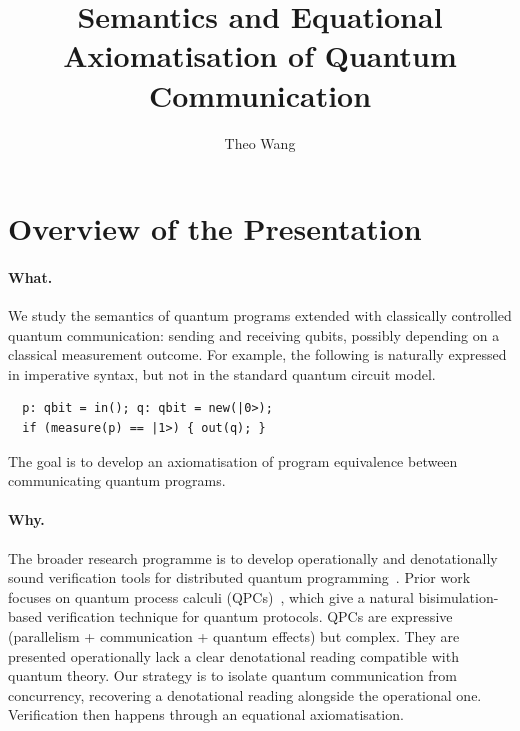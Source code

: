 \documentclass[sigplan, nonacm]{acmart}
\begin{document}
\title{Semantics and Equational Axiomatisation of Quantum Communication}

\author{Theo Wang}

\maketitle

\section{Overview of the Presentation}

\paragraph{What.} We study the semantics of quantum programs extended with classically controlled quantum communication: sending and receiving qubits, possibly depending on a classical measurement outcome. For example, the following is naturally expressed in imperative syntax, but not in the standard quantum circuit model.
\begin{lstlisting}
  p: qbit = in(); q: qbit = new(|0>); 
  if (measure(p) == |1>) { out(q); }
\end{lstlisting}
The goal is to develop an axiomatisation of program equivalence between communicating quantum programs.

\paragraph{Why.} The broader research programme is to develop operationally and denotationally sound verification tools for distributed quantum programming~\cite{DQC_survey_Caleffi_2024}. Prior work focuses on quantum process calculi (QPCs)~\cite{qCCS_ying2010algebraquantumprocesses,CQP_gay2004communicatingquantumprocesses,QPAlg_lalire2004processalgebraicapproachconcurrent, lqCCS_10.1145/3632885}, which give a natural bisimulation-based verification technique for quantum protocols. QPCs are expressive (parallelism + communication + quantum effects) but complex. They are presented operationally lack a clear denotational reading compatible with quantum theory. Our strategy is to isolate quantum communication from concurrency, recovering a denotational reading alongside the operational one. Verification then happens through an equational axiomatisation.
\end{document}
